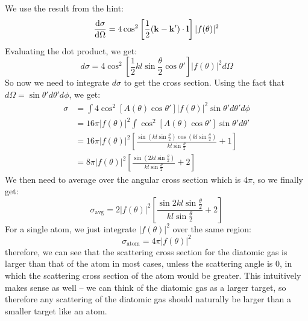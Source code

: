 \documentclass[10pt]{article}
\begin{document}
	\begin{solution}
		We use the result from the hint: 
		\[
			\dv{\sigma}{\Omega} = 4 \cos^2\left[\frac{1}{2}(\mathbf k - \mathbf k') \cdot \mathbf l\right]
			|f(\theta)|^2
		\] 
		Evaluating the dot product, we get:
		\[
			d\sigma = 4\cos^2\left[\frac{1}{2}kl\sin \frac{\theta}{2}\cos \theta'\right]|f(\theta)|^2 d\Omega
		\] 
		So now we need to integrate $d\sigma$ to get the cross section. Using the fact that $d\Omega = \sin
		\theta' d\theta' d\phi$, we get:
		\begin{align*}
			\sigma &= \int 4\cos^2\left[A(\theta) \cos \theta'\right] |f(\theta)|^2 \sin \theta' d\theta' d\phi\\
				   &= 16 \pi |f(\theta)|^2 \int \cos^2 \left[ A(\theta) \cos \theta'\right] \sin \theta' 
				   d\theta' \\
				   &= 16\pi |f(\theta)|^2 \left[ \frac{\sin (kl \sin \frac{\theta}{2}) 
					   \cos(kl \sin \frac{\theta}{2})}{kl \sin \frac{\theta}{2}} + 1\right] \\
				   &= 8\pi |f(\theta)|^2 \left[\frac{\sin (2kl \sin \frac{\theta}{2})}{kl 
				   \sin \frac{\theta}{2}} + 2\right] 
		\end{align*}
		We then need to average over the angular cross section which is $4\pi$, so we finally get: 
		\[
			\sigma_{\text{avg}} = 2|f(\theta)|^2\left[ \frac{\sin 2kl \sin \frac{\theta}{2}}{kl 
			\sin \frac{\theta}{2} } + 2\right]
		\] 
		For a single atom, we just integrate $|f(\theta)|^2$ over the same region: 
		\[
			\sigma_{\text{atom}} = 4\pi |f(\theta)|^2
		\] 
		therefore, we can see that the scattering cross section for the diatomic gas is larger than that of the
		atom in most cases, unless the scattering angle is $0$, in which the scattering cross section of the atom
		would be greater. This intuitively makes sense as well -- we can think of the diatomic gas as a larger 
		target, so therefore any scattering of the diatomic gas should naturally be larger than a smaller
		target like an atom.
	\end{solution}
\end{document}
